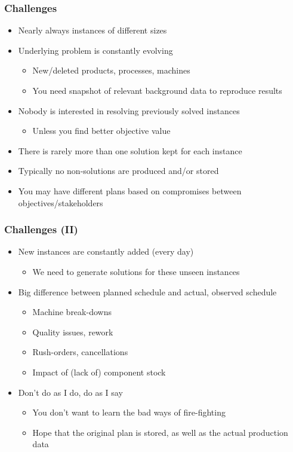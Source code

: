 \documentclass[dvipsnames,aspectratio=169]{beamer}
\begin{document}
\begin{frame}
\frametitle{Challenges}
\begin{itemize}
\item Nearly always instances of different sizes
\item Underlying problem is constantly evolving
\begin{itemize}
\item New/deleted products, processes, machines
\item You need snapshot of relevant background data to reproduce results
\end{itemize}
\item Nobody is interested in resolving previously solved instances
\begin{itemize}
\item Unless you find better objective value
\end{itemize}
\item There is rarely more than one solution kept for each instance
\item Typically no non-solutions are produced and/or stored
\item You may have different plans based on compromises between objectives/stakeholders
\end{itemize}
\end{frame}

\begin{frame}
\frametitle{Challenges (II)}
\begin{itemize}
\item New instances are constantly added (every day)
\begin{itemize}
\item We need to generate solutions for these unseen instances
\end{itemize}
\item Big difference between planned schedule and actual, observed schedule
\begin{itemize}
\item Machine break-downs
\item Quality issues, rework
\item Rush-orders, cancellations
\item Impact of (lack of) component stock
\end{itemize}
\item Don't do as I do, do as I say
\begin{itemize}
\item You don't want to learn the bad ways of fire-fighting
\item Hope that the original plan is stored, as well as the actual production data
\end{itemize}
\end{itemize}
\end{frame}
\end{document}
